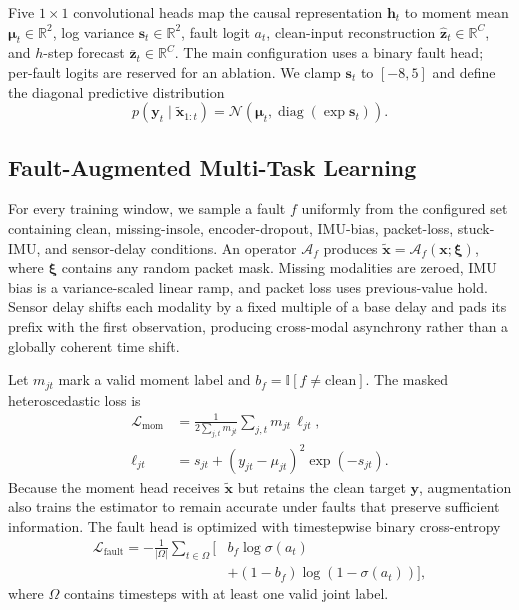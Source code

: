 \documentclass[letterpaper]{article} %
\begin{document}
Five $1\!\times\!1$ convolutional heads map the causal representation $\mathbf{h}_t$ to moment mean $\boldsymbol{\mu}_t\in\mathbb{R}^{2}$, log variance $\mathbf{s}_t\in\mathbb{R}^{2}$, fault logit $a_t$, clean-input reconstruction $\widehat{\mathbf{z}}_t\in\mathbb{R}^{C}$, and $h$-step forecast $\overline{\mathbf{z}}_t\in\mathbb{R}^{C}$.
The main configuration uses a binary fault head; per-fault logits are reserved for an ablation.
We clamp $\mathbf{s}_t$ to $[-8,5]$ and define the diagonal predictive distribution
\begin{equation}
    p(\mathbf{y}_t\mid\widetilde{\mathbf{x}}_{1:t})
    = \mathcal{N}\!\left(\boldsymbol{\mu}_t,
      \operatorname{diag}(\exp\mathbf{s}_t)\right).
\end{equation}

\subsection{Fault-Augmented Multi-Task Learning}

For every training window, we sample a fault $f$ uniformly from the configured set containing clean, missing-insole, encoder-dropout, IMU-bias, packet-loss, stuck-IMU, and sensor-delay conditions.
An operator $\mathcal{A}_f$ produces $\widetilde{\mathbf{x}}=\mathcal{A}_f(\mathbf{x};\boldsymbol{\xi})$, where $\boldsymbol{\xi}$ contains any random packet mask.
Missing modalities are zeroed, IMU bias is a variance-scaled linear ramp, and packet loss uses previous-value hold.
Sensor delay shifts each modality by a fixed multiple of a base delay and pads its prefix with the first observation, producing cross-modal asynchrony rather than a globally coherent time shift.

Let $m_{jt}$ mark a valid moment label and $b_f=\mathbb{I}[f\neq\mathrm{clean}]$.
The masked heteroscedastic loss is
\begin{equation}
\begin{aligned}
\mathcal{L}_{\mathrm{mom}}
&=\frac{1}{2\sum_{j,t}m_{jt}}\sum_{j,t}m_{jt}\,\ell_{jt},\\
\ell_{jt}&=s_{jt}+(y_{jt}-\mu_{jt})^2\exp(-s_{jt}).
\end{aligned}
\end{equation}
Because the moment head receives $\widetilde{\mathbf{x}}$ but retains the clean target $\mathbf{y}$, augmentation also trains the estimator to remain accurate under faults that preserve sufficient information.
The fault head is optimized with timestepwise binary cross-entropy
\begin{equation}
\begin{aligned}
\mathcal{L}_{\mathrm{fault}}=-\frac{1}{|\Omega|}\sum_{t\in\Omega}
\big[&b_f\log\sigma(a_t)\\
&+(1-b_f)\log(1-\sigma(a_t))\big],
\end{aligned}
\end{equation}
where $\Omega$ contains timesteps with at least one valid joint label.
\end{document}
